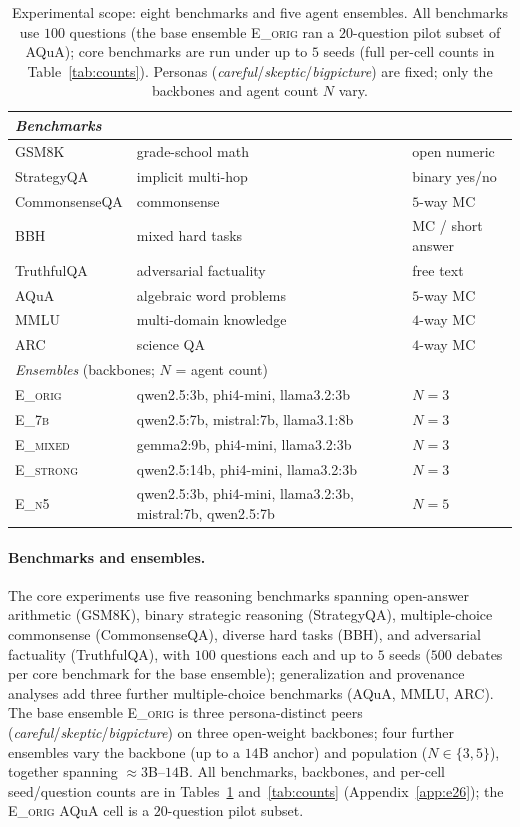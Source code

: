 \begin{table}[t]
\centering\small
\caption{Experimental scope: eight benchmarks and five agent ensembles. All benchmarks use $100$ questions
(the base ensemble \textsc{E\_orig} ran a $20$-question pilot subset of AQuA); core benchmarks are run under
up to $5$ seeds (full per-cell counts in Table~\ref{tab:counts}). Personas
(\emph{careful}/\emph{skeptic}/\emph{bigpicture}) are fixed; only the backbones and agent count $N$ vary.}
\label{tab:setup}
\begin{tabular}{lll}
\toprule
\multicolumn{3}{l}{\emph{Benchmarks}}\\
\midrule
GSM8K & grade-school math & open numeric \\
StrategyQA & implicit multi-hop & binary yes/no \\
CommonsenseQA & commonsense & $5$-way MC \\
BBH & mixed hard tasks & MC / short answer \\
TruthfulQA & adversarial factuality & free text \\
AQuA & algebraic word problems & $5$-way MC \\
MMLU & multi-domain knowledge & $4$-way MC \\
ARC & science QA & $4$-way MC \\
\midrule
\multicolumn{3}{l}{\emph{Ensembles} (backbones; $N$ = agent count)}\\
\midrule
\textsc{E\_orig}   & qwen2.5:3b, phi4-mini, llama3.2:3b & $N{=}3$ \\
\textsc{E\_7b}     & qwen2.5:7b, mistral:7b, llama3.1:8b & $N{=}3$ \\
\textsc{E\_mixed}  & gemma2:9b, phi4-mini, llama3.2:3b & $N{=}3$ \\
\textsc{E\_strong} & qwen2.5:14b, phi4-mini, llama3.2:3b & $N{=}3$ \\
\textsc{E\_n5}     & qwen2.5:3b, phi4-mini, llama3.2:3b, mistral:7b, qwen2.5:7b & $N{=}5$ \\
\bottomrule
\end{tabular}
\end{table}

\paragraph{Benchmarks and ensembles.}
\label{par:benchmarks}
The core experiments use five reasoning benchmarks spanning open-answer arithmetic (GSM8K), binary strategic
reasoning (StrategyQA), multiple-choice commonsense (CommonsenseQA), diverse hard tasks (BBH), and
adversarial factuality (TruthfulQA), with $100$ questions each and up to $5$ seeds ($500$ debates per core
benchmark for the base ensemble); generalization and provenance analyses add three further multiple-choice
benchmarks (AQuA, MMLU, ARC). The base ensemble \textsc{E\_orig} is three persona-distinct peers
(\emph{careful}/\emph{skeptic}/\emph{bigpicture}) on three open-weight backbones; four further ensembles vary
the backbone (up to a $14$B anchor) and population ($N\in\{3,5\}$), together spanning $\approx\!3$B--$14$B.
All benchmarks, backbones, and per-cell seed/question counts are in Tables~\ref{tab:setup}
and~\ref{tab:counts} (Appendix~\ref{app:e26}); the \textsc{E\_orig} AQuA cell is a $20$-question pilot subset.

